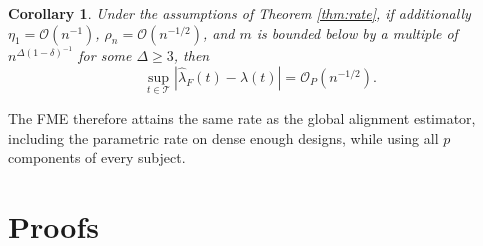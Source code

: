 \documentclass[11pt]{article}
\newtheorem{corollary}{Corollary}
\newcommand{\T}{\mathcal{T}}
\newcommand{\lhat}{\hat{\lambda}}
\newcommand{\Op}{\mathcal{O}_P}
\newcommand{\sups}{\sup_{t \in \T}}
\begin{document}
\begin{corollary}
  \label{cor:param}
  Under the assumptions of Theorem \ref{thm:rate}, if additionally
  $\eta_1 = \mathcal{O}(n^{-1})$, $\rho_n = \mathcal{O}(n^{-1/2})$, and $m$ is bounded below
  by a multiple of $n^{\Delta(1-\delta)^{-1}}$ for some $\Delta \ge 3$, then
  \[
    \sups |\lhat_F(t) - \lambda(t)| = \Op(n^{-1/2}).
  \]
\end{corollary}

The FME therefore attains the same rate as the global alignment estimator, including the
parametric rate on dense enough designs, while using all $p$ components of every subject.

\section{Proofs}
\label{sec:proofs}
\end{document}
